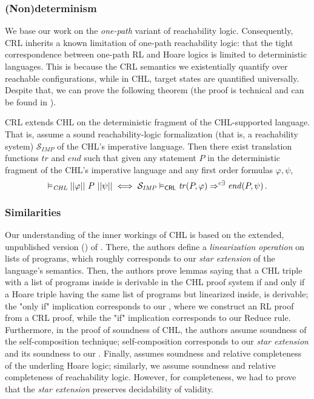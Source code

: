 \subsubsection{(Non)determinism}
We base our work on the \emph{one-path} variant of reachability logic.
Consequently, CRL inherits a known limitation of one-path reachability logic: that the tight correspondence between
one-path RL and Hoare logics is limited to deterministic languages.
This is because the CRL semantics we existentially quantify
over reachable configurations, while in CHL, target states are quantified
universally. %
Despite that, we can prove the following theorem (the proof is technical and can be found in ).
\begin{theorem}\label{thm:chlCRLrelation}
  CRL extends CHL on the deterministic fragment of the CHL-supported language.
  That is, assume a sound reachability-logic formalization (that is, a reachability system) $\mathcal{S}_{\mathit{IMP}}$ of the CHL's imperative language.
  Then there exist translation functions $\mathit{tr}$ and $\mathit{end}$ such that
  given any statement $P$ in the deterministic fragment of the CHL's imperative language
  and any first order formulas $\varphi, \psi$,
  \begin{equation*}
    \vDash_{\mathit{CHL}} ||\varphi||\ P\ ||\psi||
    \iff
    \mathcal{S}_{\mathit{IMP}} \vDash_\CRL \mathit{tr}(P, \varphi) \Rightarrow^{c\exists} \mathit{end}(P, \psi) \, .
  \end{equation*}
\end{theorem}


\subsubsection{Similarities}

Our understanding of the inner workings of CHL is based on the extended, unpublished version (\cite{SousaD16Extended})
of \cite{SousaD16}.
There, the authors define a \emph{linearization operation} on lists of programs, which roughly corresponds to our
\emph{star extension} of the language's semantics.
Then, the authors prove lemmas saying that a CHL triple with a list of programs inside is derivable
in the CHL proof system
if and only if 
a Hoare triple having the same list of programs but linearized inside, is derivable;
the "only if" implication corresponds to our , where we construct
an RL proof from a CRL proof,
while the "if" implication corresponds to our Reduce rule.
Furthermore, in the proof of soundness of CHL, the authors assume soundness of the self-composition technique;
self-composition corresponds to our \emph{star extension} and its soundness to our .
Finally, \cite{SousaD16Extended} assumes soundness and relative completeness of the underling Hoare logic;
similarly, we assume soundness and relative completeness of reachability logic.
However, for completeness, we had to prove that the \emph{star extension} preserves decidability of validity.

